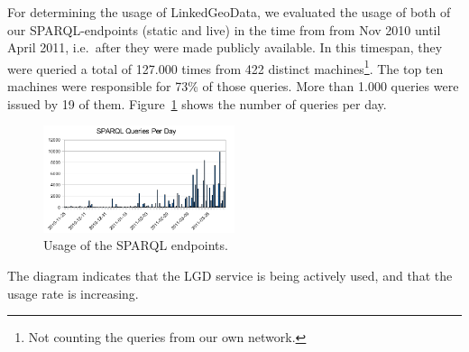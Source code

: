 For determining the usage of LinkedGeoData, we evaluated the usage of both of our
SPARQL-endpoints (static and live) in the time from from Nov 2010 until April
2011, i.e.~after they were made publicly available. In this timespan, they were queried a
total of 127.000 times from
422 distinct machines\footnote{Not counting the queries from our own network.}.
The top ten machines were responsible for 73\% of those queries. More than 1.000
queries were issued by 19 of them.
Figure~\ref{fig:sparql-queries-per-day} shows the number of queries per day.
\begin{figure}[htbp]
	\centering
		\includegraphics[width=0.5\textwidth]{images/SparqlQueriesPerDay.pdf}
	\caption{Usage of the SPARQL endpoints.}
	\label{fig:sparql-queries-per-day}
\end{figure}
The diagram indicates that the LGD service is being actively used, and
that the usage rate is increasing.

